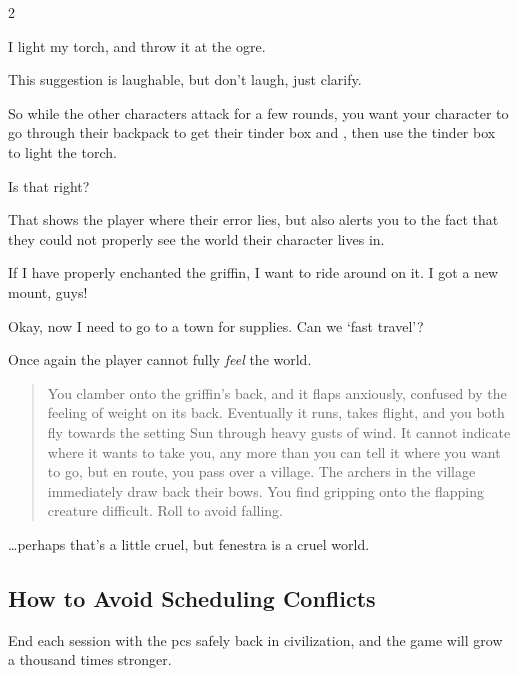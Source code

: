 \begin{multicols}{2}
\begin{boxtext}
  I light my \gls{torch}, and throw it at the \gls{ogre}.
\end{boxtext}

This suggestion is laughable, but don't laugh, just clarify.

\begin{speechtext}
  So while the other characters attack for a few rounds, you want your character to go through their backpack to get their tinder box and , then use the tinder box to light the \gls{torch}.

  Is that right?
\end{speechtext}

That shows the player where their error lies, but also alerts you to the fact that they could not properly see the world their character lives in.

\begin{boxtext}
  If I have properly enchanted the \gls{griffin}, I want to ride around on it.
  I got a new mount, guys!

  Okay, now I need to go to a town for supplies.
  Can we `fast travel'?
\end{boxtext}

Once again the player cannot fully \emph{feel} the world.

\null
\begin{quote}
  You clamber onto the \gls{griffin}'s back, and it flaps anxiously, confused by the feeling of weight on its back.
  Eventually it runs, takes flight, and you both fly towards the setting Sun through heavy gusts of wind.
  It cannot indicate where it wants to take you, any more than you can tell it where you want to go, but en route, you pass over a \gls{village}.
  The archers in the \gls{village} immediately draw back their bows.
  You find gripping onto the flapping creature difficult.
  Roll  to avoid falling.
\end{quote}

\noindent
\ldots perhaps that's a little cruel, but \gls{fenestra} is a cruel world.

\subsection{How to Avoid Scheduling Conflicts}
\label{realtimeScheduling}

End each session with the \glspl{pc} safely back in civilization, and the game will grow a thousand times stronger.


\end{multicols}
